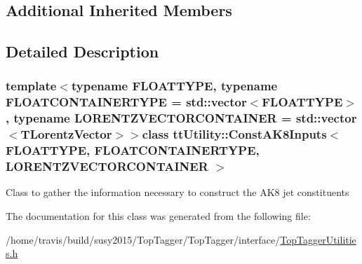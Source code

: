 \subsection*{Additional Inherited Members}


\subsection{Detailed Description}
\subsubsection*{template$<$typename F\-L\-O\-A\-T\-T\-Y\-P\-E, typename F\-L\-O\-A\-T\-C\-O\-N\-T\-A\-I\-N\-E\-R\-T\-Y\-P\-E = std\-::vector$<$\-F\-L\-O\-A\-T\-T\-Y\-P\-E$>$, typename L\-O\-R\-E\-N\-T\-Z\-V\-E\-C\-T\-O\-R\-C\-O\-N\-T\-A\-I\-N\-E\-R = std\-::vector$<$\-T\-Lorentz\-Vector$>$$>$class tt\-Utility\-::\-Const\-A\-K8\-Inputs$<$ F\-L\-O\-A\-T\-T\-Y\-P\-E, F\-L\-O\-A\-T\-C\-O\-N\-T\-A\-I\-N\-E\-R\-T\-Y\-P\-E, L\-O\-R\-E\-N\-T\-Z\-V\-E\-C\-T\-O\-R\-C\-O\-N\-T\-A\-I\-N\-E\-R $>$}

Class to gather the information necessary to construct the A\-K8 jet constituents 

The documentation for this class was generated from the following file\-:\begin{DoxyCompactItemize}
\item 
/home/travis/build/susy2015/\-Top\-Tagger/\-Top\-Tagger/interface/\hyperlink{TopTaggerUtilities_8h}{Top\-Tagger\-Utilities.\-h}\end{DoxyCompactItemize}
